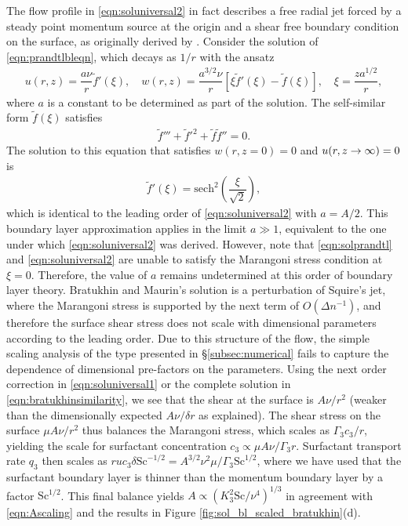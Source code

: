 \documentclass[]{jfm}
\newcommand{\Sc}{\text{Sc}}
\begin{document}
The flow profile in \eqref{eqn:soluniversal2} in fact describes a free radial jet forced by a steady point momentum source at the origin and a shear free boundary condition on the surface, as originally derived by \cite{Squire1955}.
Consider the solution of \eqref{eqn:prandtlbleqn}, which decays as $1/r$ with the ansatz
\begin{align}
u(r,z) = \dfrac{a\nu}{r} \tilde{f}'(\xi), \quad w(r,z) = \dfrac{a^{3/2} \nu}{r}\left[\xi \tilde{f}'(\xi) - \tilde{f}(\xi) \right], \quad \xi = \dfrac{za^{1/2}}{r}, 
\end{align}
where $a$ is a constant to be determined as part of the solution.
The self-similar form $\tilde{f}(\xi)$ satisfies
\begin{align}
 \tilde{f}''' + \tilde{f}'^2 + \tilde{f}\tilde{f}'' = 0.
\end{align}
The solution to this equation that satisfies $w(r,z=0)=0$ and $u(r, z\to\-\infty)=0$ is
\begin{align}
\tilde{f}'(\xi) = \text{sech}^2 \left( \dfrac{\xi}{\sqrt{2}} \right), 
\label{eqn:solprandtl}
\end{align}
which is identical to the leading order of \eqref{eqn:soluniversal2} with $a=A/2$.
This boundary layer approximation applies in the limit $a \gg 1$, equivalent to the one under which \eqref{eqn:soluniversal2} was derived. 
However, note that \eqref{eqn:solprandtl} and \eqref{eqn:soluniversal2} are unable to satisfy the Marangoni stress condition at $\xi=0$.
Therefore, the value of $a$ remains undetermined at this order of boundary layer theory.
Bratukhin and Maurin's solution is a perturbation of Squire's jet, where the Marangoni stress is supported by the next term of $O(\Delta n^{-1})$, and therefore the surface shear stress does not scale with dimensional parameters according to the leading order. 
Due to this structure of the flow, the simple scaling analysis of the type presented in \S\ref{subsec:numerical} fails to capture the dependence of dimensional pre-factors on the parameters. 
Using the next order correction in \eqref{eqn:soluniversal1} or the complete solution in \eqref{eqn:bratukhinsimilarity}, we see that the shear at the surface is $A\nu/r^2$ (weaker than the dimensionally expected $A \nu/\delta r$ as explained).
The shear stress on the surface $\mu A \nu /r^2$ thus balances the Marangoni stress, which scales as $\Gamma_3 c_3/r$, yielding the scale for surfactant concentration $c_3 \propto \mu A \nu / \Gamma_3 r$. 
Surfactant transport rate $q_3$ then scales as $r u c_3 \delta \Sc^{-1/2} = A^{3/2} \nu^2 \mu/\Gamma_3 \Sc^{1/2}$, where we have used that the surfactant boundary layer is thinner than the momentum boundary layer by a factor $\Sc^{1/2}$.
This final balance yields $A \propto (K_3^2 \Sc/\nu^4)^{1/3}$ in agreement with \eqref{eqn:Ascaling} and the results in Figure \ref{fig:sol_bl_scaled_bratukhin}(d).
\end{document}

